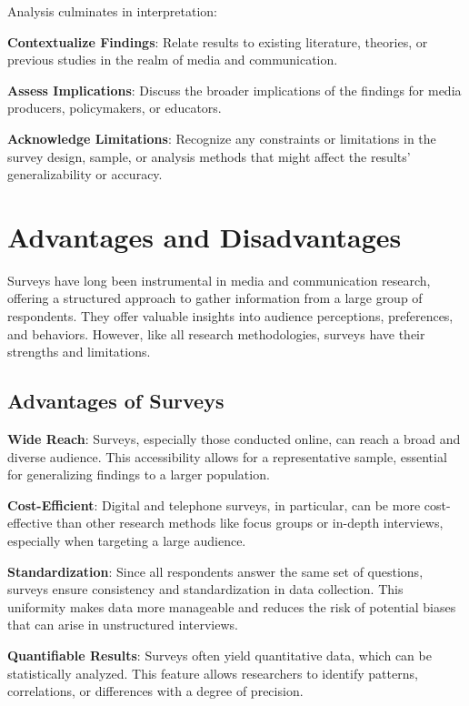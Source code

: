 \documentclass[
  b5paper]{book}
\begin{document}
Analysis culminates in interpretation:

\textbf{Contextualize Findings}: Relate results to existing literature, theories, or previous studies in the realm of media and communication.

\textbf{Assess Implications}: Discuss the broader implications of the findings for media producers, policymakers, or educators.

\textbf{Acknowledge Limitations}: Recognize any constraints or limitations in the survey design, sample, or analysis methods that might affect the results' generalizability or accuracy.

\hypertarget{advantages-and-disadvantages}{%
\section{Advantages and Disadvantages}\label{advantages-and-disadvantages}}

Surveys have long been instrumental in media and communication research, offering a structured approach to gather information from a large group of respondents.
They offer valuable insights into audience perceptions, preferences, and behaviors.
However, like all research methodologies, surveys have their strengths and limitations.

\hypertarget{advantages-of-surveys}{%
\subsection*{Advantages of Surveys}\label{advantages-of-surveys}}

\textbf{Wide Reach}: Surveys, especially those conducted online, can reach a broad and diverse audience.
This accessibility allows for a representative sample, essential for generalizing findings to a larger population.

\textbf{Cost-Efficient}: Digital and telephone surveys, in particular, can be more cost-effective than other research methods like focus groups or in-depth interviews, especially when targeting a large audience.

\textbf{Standardization}: Since all respondents answer the same set of questions, surveys ensure consistency and standardization in data collection.
This uniformity makes data more manageable and reduces the risk of potential biases that can arise in unstructured interviews.

\textbf{Quantifiable Results}: Surveys often yield quantitative data, which can be statistically analyzed.
This feature allows researchers to identify patterns, correlations, or differences with a degree of precision.
\end{document}
